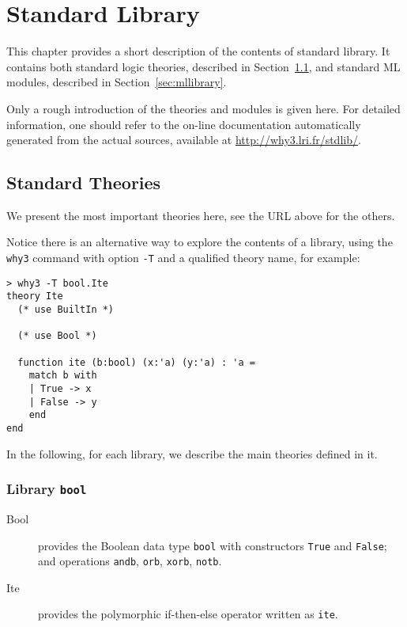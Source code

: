\chapter{Standard Library}
\label{chap:library}

This chapter provides a short description of the contents of \why
standard library. It contains both standard logic theories, described
in Section~\ref{sec:stdlib}, and standard ML modules, described in
Section~\ref{sec:mllibrary}.

Only a rough introduction of the theories and modules is given
here. For detailed information, one should refer to the on-line
documentation automatically generated from the actual sources,
available at \url{http://why3.lri.fr/stdlib/}.


\section{Standard Theories}
\label{sec:stdlib}

We present the most important theories here, see the URL above for the
others.

Notice there is an alternative way to explore the contents of a
library, using the \verb|why3| command with option 
\verb|-T| and a qualified theory name, for example:
\begin{verbatim}
> why3 -T bool.Ite
theory Ite
  (* use BuiltIn *)

  (* use Bool *)

  function ite (b:bool) (x:'a) (y:'a) : 'a =
    match b with
    | True -> x
    | False -> y
    end
end
\end{verbatim}

In the following, for each library, we describe the main theories
defined in it.

\subsection{Library \texttt{bool}}

\begin{description}

\item[Bool] provides the Boolean data type \verb|bool| with
  constructors \verb|True| and \verb|False|; and operations \verb|andb|, \verb|orb|, \verb|xorb|, \verb|notb|.

\item[Ite] provides the polymorphic if-then-else operator written as \verb|ite|.

\end{description}

